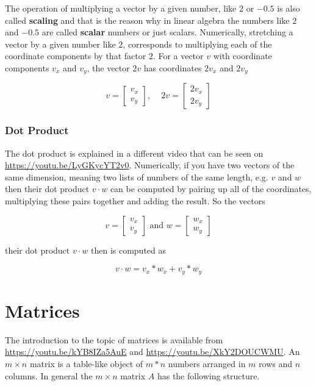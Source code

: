 \documentclass[]{book}
\theoremstyle{definition}
\theoremstyle{definition}
\theoremstyle{definition}
\theoremstyle{remark}
\begin{document}
The operation of multiplying a vector by a given number, like \(2\) or \(-0.5\) is also called \textbf{scaling} and that is the reason why in linear algebra the numbers like \(2\) and \(-0.5\) are called \textbf{scalar} numbers or just scalars. Numerically, stretching a vector by a given number like \(2\), corresponds to multiplying each of the coordinate components by that factor \(2\). For a vector \(v\) with coordinate components \(v_x\) and \(v_y\), the vector \(2v\) has coordinates \(2v_x\) and \(2v_y\)

\[v = \left[\begin{array}{c} v_x \\ v_y \end{array}\right] \text{, }\quad 2v = \left[\begin{array}{c} 2v_x \\ 2v_y \end{array}\right]\]

\hypertarget{intro-linalg-dot-product}{%
\subsubsection{Dot Product}\label{intro-linalg-dot-product}}

The dot product is explained in a different video that can be seen on \url{https://youtu.be/LyGKycYT2v0}. Numerically, if you have two vectors of the same dimension, meaning two lists of numbers of the same length, e.g. \(v\) and \(w\) then their dot product \(v \cdot w\) can be computed by pairing up all of the coordinates, multiplying these pairs together and adding the result. So the vectors

\[v = \left[\begin{array}{c} v_x \\ v_y \end{array}\right] \text{ and } w= \left[\begin{array}{c} w_x \\ w_y \end{array}\right]\]

their dot product \(v \cdot w\) then is computed as

\[v \cdot w = v_x * w_x + v_y * w_y\]

\hypertarget{intro-linalg-matrices}{%
\section{Matrices}\label{intro-linalg-matrices}}

The introduction to the topic of matrices is available from \url{https://youtu.be/kYB8IZa5AuE} and \url{https://youtu.be/XkY2DOUCWMU}. An \(m \times n\) matrix is a table-like object of \(m*n\) numbers arranged in \(m\) rows and \(n\) columns. In general the \(m \times n\) matrix \(A\) has the following structure.
\end{document}
